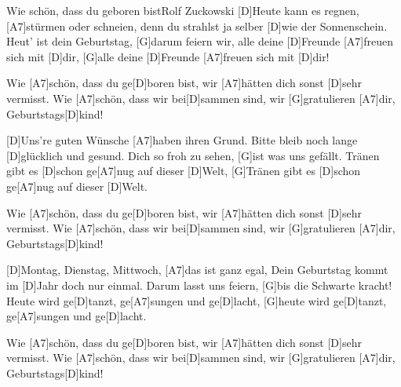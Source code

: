 \documentclass[../main.tex]{subfiles}
\begin{document}
\begin{song}{Wie schön, dass du geboren bist}{Rolf Zuckowski}{}
[D]Heute kann es regnen, [A7]stürmen oder schneien,
denn du strahlst ja selber [D]wie der Sonnenschein.
Heut' ist dein Geburtstag, [G]darum feiern wir,
alle deine [D]Freunde [A7]freuen sich mit [D]dir,
[G]alle deine [D]Freunde [A7]freuen sich mit [D]dir!

Wie [A7]schön, dass du ge[D]boren bist,
wir [A7]hätten dich sonst [D]sehr vermisst.
Wie [A7]schön, dass wir bei[D]sammen sind,
wir [G]gratulieren [A7]dir, Geburtstags[D]kind!

[D]Uns're guten Wünsche [A7]haben ihren Grund.
Bitte bleib noch lange [D]glücklich und gesund.
Dich so froh zu sehen, [G]ist was uns gefällt.
Tränen gibt es [D]schon ge[A7]nug auf dieser [D]Welt,
[G]Tränen gibt es [D]schon ge[A7]nug auf dieser [D]Welt.

Wie [A7]schön, dass du ge[D]boren bist,
wir [A7]hätten dich sonst [D]sehr vermisst.
Wie [A7]schön, dass wir bei[D]sammen sind,
wir [G]gratulieren [A7]dir, Geburtstags[D]kind!

[D]Montag, Dienstag, Mittwoch, [A7]das ist ganz egal,
Dein Geburtstag kommt im [D]Jahr doch nur einmal.
Darum lasst uns feiern, [G]bis die Schwarte kracht!
Heute wird ge[D]tanzt, ge[A7]sungen und ge[D]lacht,
[G]heute wird ge[D]tanzt, ge[A7]sungen und ge[D]lacht.

Wie [A7]schön, dass du ge[D]boren bist,
wir [A7]hätten dich sonst [D]sehr vermisst.
Wie [A7]schön, dass wir bei[D]sammen sind,
wir [G]gratulieren [A7]dir, Geburtstags[D]kind!
\end{song}
\end{document}
